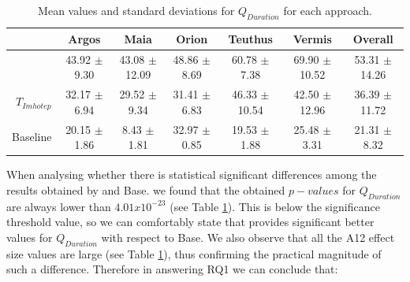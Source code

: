 \begin{table}[tb]
\centering
\caption{Mean values and standard deviations for $Q_{Duration}$ for each approach.}
\label{tab:resultsWilcEffRQ1}
\begin{tabular}{@{}ccccccc@{}}
\toprule
    & Argos            & Maia              & Orion            & Teuthus           & Vermis            & Overall           \\ \midrule
                                   \rowcolor[HTML]{C0C0C0}
\multicolumn{1}{r}{\cellcolor[HTML]{FFFFFF}{$S_{Imhotep}$}} & 43.92 $\pm$ 9.30 & 43.08 $\pm$ 12.09 & 48.86 $\pm$ 8.69 & 60.78 $\pm$ 7.38  & 69.90 $\pm$ 10.52 & 53.31 $\pm$ 14.26 \\ \midrule
\multicolumn{1}{r}{$T_{Imhotep}$} & 32.17 $\pm$ 6.94 & 29.52 $\pm$ 9.34  & 31.41 $\pm$ 6.83 & 46.33 $\pm$ 10.54 & 42.50 $\pm$ 12.96 & 36.39 $\pm$ 11.72 \\ \midrule
\multicolumn{1}{r}{Baseline} & 20.15 $\pm$ 1.86 & 8.43 $\pm$ 1.81   & 32.97 $\pm$ 0.85 & 19.53 $\pm$ 1.88  & 25.48 $\pm$ 3.31  & 21.31 $\pm$ 8.32  \\ \bottomrule
\end{tabular}
\end{table}


When analysing whether there is statistical significant differences among the results obtained by \simhotep{}  and Base. we found that the obtained $p-values$ for $Q_{Duration}$ are always lower than $4.01x10^{-23}$  (see Table \ref{tab:resultsWilcEffRQ1}). This is below the significance threshold value, so we can comfortably state that \simhotep{} provides significant better values for $Q_{Duration}$ with respect to Base. We also observe that all the  A12 effect size values are large (see Table \ref{tab:resultsWilcEffRQ1}), thus confirming the practical magnitude of such a difference.
Therefore in answering RQ1 we can conclude that:

